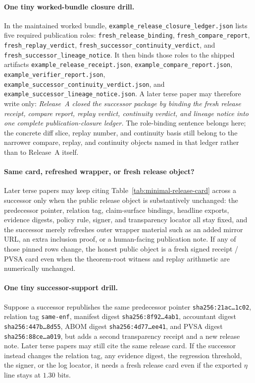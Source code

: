 \documentclass[11pt]{article}
\begin{document}
\paragraph{One tiny worked-bundle closure drill.} In the maintained worked bundle, \nolinkurl{example_release_closure_ledger.json} lists five required publication roles: \nolinkurl{fresh_release_binding}, \nolinkurl{fresh_compare_report}, \nolinkurl{fresh_replay_verdict}, \nolinkurl{fresh_successor_continuity_verdict}, and \nolinkurl{fresh_successor_lineage_notice}.  It then binds those roles to the shipped artifacts \nolinkurl{example_release_receipt.json}, \nolinkurl{example_compare_report.json}, \nolinkurl{example_verifier_report.json}, \nolinkurl{example_successor_continuity_verdict.json}, and \nolinkurl{example_successor_lineage_notice.json}.  A later terse paper may therefore write only: \emph{Release~A closed the successor package by binding the fresh release receipt, compare report, replay verdict, continuity verdict, and lineage notice into one complete publication-closure ledger.}  The role-binding sentence belongs here; the concrete diff slice, replay number, and continuity basis still belong to the narrower compare, replay, and continuity objects named in that ledger rather than to Release~A itself.\cite{series:workedexample}

\paragraph{Same card, refreshed wrapper, or fresh release object?} Later terse papers may keep citing Table~\ref{tab:minimal-release-card} across a successor only when the public release object is substantively unchanged: the predecessor pointer, relation tag, claim-surface bindings, headline exports, evidence digests, policy rule, signer, and transparency locator all stay fixed, and the successor merely refreshes outer wrapper material such as an added mirror URL, an extra inclusion proof, or a human-facing publication note. If any of those pinned rows change, the honest public object is a fresh signed receipt / PVSA card even when the theorem-root witness and replay arithmetic are numerically unchanged.

\paragraph{One tiny successor-support drill.} Suppose a successor republishes the same predecessor pointer \texttt{sha256:21ac\ldots 1c02}, relation tag \texttt{same-enf}, manifest digest \texttt{sha256:8f92\ldots 4ab1}, accountant digest \texttt{sha256:447b\ldots 8d55}, ABOM digest \texttt{sha256:4d77\ldots ee41}, and PVSA digest \texttt{sha256:88ce\ldots a019}, but adds a second transparency receipt and a new release note. Later terse papers may still cite the same release card. If the successor instead changes the relation tag, any evidence digest, the regression threshold, the signer, or the log locator, it needs a fresh release card even if the exported \(\eta\) line stays at \(1.30\) bits.
\end{document}
